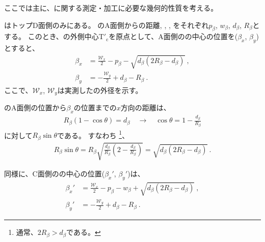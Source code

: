 

ここでは主に、\textbf{\EndFaceBoring}に関する測定・加工に必要な幾何的性質を考える。



\EndFaceBoring はトップD面側のみにある。
\EndFaceBoring のA面側からの距離, \EndFaceBoringWidth, \EndFaceBoringDepth, \EndFaceBoringCornerR をそれぞれ$p_\beta$, $w_\beta$, $d_\beta$, $R_\beta$とする。
このとき、\TopEndFace の外側中心T$'_\mathrm c$を原点として、A面側の\EndFaceBoringCornerR の中心の位置を($\beta_x$, $\beta_y$)とすると、
\begin{align*}
  \beta_x &= \frac{\mathcal W_x}2-p_\beta-\sqrt{d_\beta(2R_\beta-d_\beta)}\ ,\\
  \beta_y &= -\frac{\mathcal W_y}2+d_\beta-R_\beta\ .
\end{align*}
ここで、$\mathcal W_x$, $\mathcal W_y$は実測した\TopEndFace の外径を示す。
\begin{hosoku}
\EndFaceBoring のA面側の位置から$\beta_x$の位置までの$x$方向の距離は、
\begin{align*}
  R_\beta(1-\cos\theta) = d_\beta\quad
  \longrightarrow\quad
  \cos\theta = 1-\frac{d_\beta}{R_\beta}
\end{align*}
に対して$R_\beta\sin\theta$である。
すなわち
\footnote{通常、$2R_\beta > d_\beta$である。}、
\begin{align*}
  R_\beta\sin\theta
  = R_\beta\sqrt{\frac{d_\beta}{R_\beta}\left(2-\frac{d_\beta}{R_\beta}\right)}
  = \sqrt{d_\beta(2R_\beta-d_\beta)}\ .
\end{align*}
\end{hosoku}
同様に、C面側の\EndFaceBoringCornerR の中心の位置($\beta_x'$, $\beta_y'$)は、
\begin{align*}
  \beta_x' &= \frac{\mathcal W_x}2-p_\beta-w_\beta+\sqrt{d_\beta(2R_\beta-d_\beta)}\ ,\\
  \beta_y' &= -\frac{\mathcal W_y}2+d_\beta-R_\beta\ .
\end{align*}



